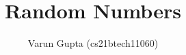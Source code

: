 \documentclass[journal,12pt,twocolumn]{IEEEtran}
\begin{document}
\makeatletter
{}
\makeatother
\let\StandardTheFigure\thefigure
\let\vec\mathbf
\def\putbox#1#2#3{\makebox[0in][l]{\makebox[#1][l]{}\raisebox{\baselineskip}[0in][0in]{\raisebox{#2}[0in][0in]{#3}}}}
\def\rightbox#1{\makebox[0in][r]{#1}}
\def\centbox#1{\makebox[0in]{#1}}
\def\topbox#1{\raisebox{-\baselineskip}[0in][0in]{#1}}
\def\midbox#1{\raisebox{-0.5\baselineskip}[0in][0in]{#1}}
\title{
    Random Numbers
}
\author{ Varun Gupta (cs21btech11060)%
}
\graphicspath{{figures/}}
%
%
%
% 
%
\end{document}
